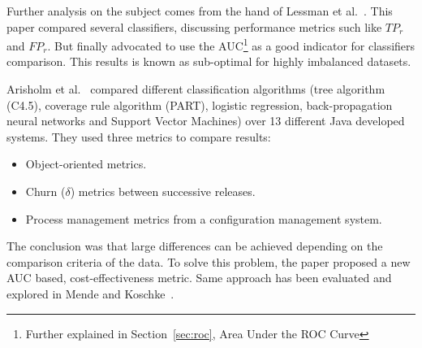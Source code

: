 Further analysis on the subject comes from the hand of Lessman et 
al.~\cite{LBMP08}. This paper compared several classifiers, discussing 
performance metrics such like $TP_r$ and $FP_r$. But finally advocated to use 
the AUC\footnote{Further explained in Section~\ref{sec:roc}, Area Under the ROC 
Curve} as a good indicator for classifiers comparison. This results is known as 
sub-optimal for highly imbalanced datasets.

Arisholm et al.~\cite{Arisholm10} compared different classification
algorithms (tree algorithm (C4.5), coverage rule algorithm (PART), logistic 
regression, back-propagation neural networks and Support Vector Machines) over 
13 different Java developed systems. They used three metrics to compare results:

\begin{itemize}
    \item Object-oriented metrics.
    \item Churn ($\delta$) metrics between successive releases.
    \item Process management metrics from a configuration management system.
\end{itemize}

The conclusion was that large differences can be achieved depending on the 
comparison criteria of the data. To solve this problem, the paper proposed a 
new AUC based, cost-effectiveness metric. Same approach has been evaluated and 
explored in Mende and Koschke~\cite{Mende10}.
